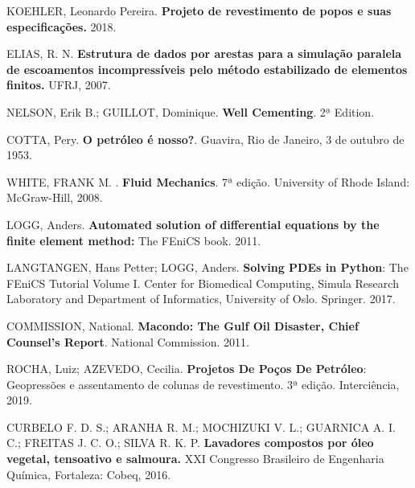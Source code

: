 

KOEHLER, Leonardo Pereira. {\bf Projeto de revestimento de popos e suas especificações.} 2018.

 ELIAS, R. N. {\bf Estrutura de dados por arestas para a simulação paralela de escoamentos incompressíveis pelo método estabilizado de elementos finitos.} UFRJ, 2007.

 NELSON, Erik B.; GUILLOT, Dominique. {\bf Well Cementing}. 2ª Edition. 

 COTTA, Pery. {\bf O petróleo é nosso?}. Guavira, Rio de Janeiro, 3 de outubro de 1953.

 WHITE, FRANK M. . {\bf Fluid Mechanics}. 7ª edição. University of Rhode Island: McGraw-Hill, 2008.

 LOGG, Anders. {\bf Automated solution of differential equations by the finite element method:} The FEniCS book. 2011.

LANGTANGEN, Hans Petter; LOGG, Anders. {\bf Solving PDEs in Python}: The FEniCS Tutorial Volume I. Center for Biomedical Computing, Simula Research Laboratory and Department of Informatics, University of Oslo. Springer. 2017.

COMMISSION, National.  {\bf Macondo: The Gulf Oil Disaster, Chief Counsel's Report}. National Commission. 2011.

ROCHA, Luiz; AZEVEDO, Cecilia. {\bf Projetos De Poços De Petróleo}: Geopressões e assentamento de colunas de revestimento. 3ª edição. Interciência, 2019.


 CURBELO F. D. S.; ARANHA R. M.; MOCHIZUKI V. L.; GUARNICA A. I. C.; FREITAS J. C. O.; SILVA R. K. P. {\bf Lavadores compostos por óleo vegetal, tensoativo e salmoura.} XXI Congresso Brasileiro de Engenharia Química, Fortaleza: Cobeq, 2016.


